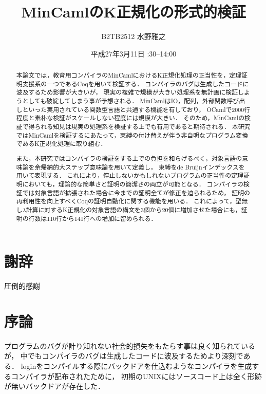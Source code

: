 \documentclass{sumiilab-paper}
\title{MinCamlのK正規化の形式的検証}
\author{B2TB2512 水野雅之}
\institute{東北大学 工学部\\情報知能システム総合学科}%
\date{平成27年3月11日 \quad 13:30--14:00}
\begin{document}
\maketitle

\begin{abstract}
本論文では，教育用コンパイラのMinCamlにおけるK正規化処理の正当性を，定理証明支援系の一つであるCoqを用いて検証する．
コンパイラのバグは生成したコードに波及するため影響が大きいが，
現実の複雑で規模が大きい処理系を無計画に検証しようとしても破綻してしまう事が予想される．
MinCamlはIO，配列，外部関数呼び出しといった実用されている関数型言語と共通する機能を有しており，
OCamlで2000行程度と素朴な検証がスケールしない程度には規模が大きい．
そのため，MinCamlの検証で得られる知見は現実の処理系を検証する上でも有用であると期待される．
本研究ではMinCamlを検証するにあたって，束縛の付け替えが伴う非自明なプログラム変換であるK正規化処理に取り組む．

また，本研究ではコンパイラの検証をする上での負担を和らげるべく，対象言語の意味論を余帰納的大ステップ意味論を用いて定義し，
束縛をde Bruijnインデックスを用いて表現する．
これにより，停止しないかもしれないプログラムの正当性の定理証明においても，理論的な簡単さと証明の簡潔さの両立が可能となる．
コンパイラの検証では対象言語が拡張された場合に今までの証明全てが修正を迫られるため，
証明の再利用性を向上すべくCoqの証明自動化に関する機能を用いる．
これによって，型無し$\lambda$計算に対するK正規化の対象言語の構文を3個から20個に増加させた場合にも，証明の行数は110行から141行への増加に留められる．
\end{abstract}

\chapter*{謝辞}

圧倒的感謝

\tableofcontents


\chapter{序論}


プログラムのバグが計り知れない社会的損失をもたらす事は良く知られているが，
中でもコンパイラのバグは生成したコードに波及するためより深刻である．
loginをコンパイルする際にバックドアを仕込むようなコンパイラを生成するコンパイラが配布されたために，
初期のUNIXにはソースコード上は全く形跡が無いバックドアが存在した．\cite{DBLP:journals/cacm/Thompson84}
\end{document}
